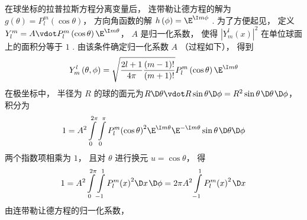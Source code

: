 
在球坐标的拉普拉斯方程分离变量后， 连带勒让德方程的解为 $g\left( \theta  \right) = P_l^m\left( {\cos \theta } \right)$， 方向角函数的解 $h\left( \phi  \right) = {\E^{\I m\phi }}$ . 为了方便起见， 定义 $Y_l^m = A \vdot P_l^m\left( {\cos \theta } \right){\E^{\I m\theta }}$， $A$ 是归一化系数， 使得 ${\left| {Y_m^l\left( x \right)} \right|^2}$ 在单位球面上的面积分等于 $1$ .  由该条件确定归一化系数 $A$ （过程如下）， 得到
\begin{equation}
  Y_m^l\left( {\theta ,\phi } \right) = \sqrt {\frac{{2l + 1}}{{4\pi }}\frac{{(m - 1)!}}{{(m + 1)!}}} P_l^m\left( {\cos \theta } \right){\E^{\I m\theta }}
\end{equation}
在极坐标中， 半径为 $R$ 的球的面元为$R \D \theta  \vdot R\sin \theta \D \phi  = {R^2}\sin \theta {\kern 1pt} \D \theta {\kern 1pt} \D \phi $，  积分为
\begin{equation}
  1 = {A^2}\int\limits_0^{2\pi } {\int\limits_0^\pi  {P_l^m{{\left( {\cos \theta } \right)}^2}{\E^{\I m\theta }}{\E^{ - \I m\theta }}\sin \theta {\kern 1pt} \D \theta  \D \phi } } 
\end{equation}
两个指数项相乘为 $1$，  且对 $\theta $ 进行换元 $u = \cos \theta $， 得
\begin{equation}
  1 = {A^2}\int\limits_0^{2\pi } {\int\limits_{ - 1}^1 {P_l^m{{\left( x \right)}^2}\D x{\kern 1pt} \D \phi } }  = 2\pi {A^2}\int\limits_{ - 1}^1 {P_l^m{{\left( x \right)}^2}{\kern 1pt} \D x{\kern 1pt} } 
\end{equation}
由连带勒让德方程的归一化系数， %

